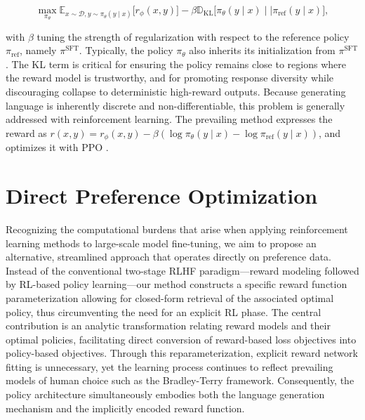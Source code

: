 \begin{equation}\label{eq:RL}
\max_{\pi_{\theta}}  \mathbb{E}_{x\sim \mathcal{D}, y\sim \pi_{\theta}(y \mid x)}\bigl[r_{\phi}(x, y)\bigr] - \beta\mathbb{D}_{\textrm{KL}}\bigl[\pi_{\theta}(y\mid x)\mid \mid \pi_\text{ref}(y\mid x)\bigr],
\end{equation}

with $\beta$ tuning the strength of regularization with respect to the reference policy $\pi_\text{ref}$, namely $\pi^\text{SFT}$. Typically, the policy $\pi_\theta$ also inherits its initialization from $\pi^\text{SFT}$. The KL term is critical for ensuring the policy remains close to regions where the reward model is trustworthy, and for promoting response diversity while discouraging collapse to deterministic high-reward outputs. Because generating language is inherently discrete and non-differentiable, this problem is generally addressed with reinforcement learning. The prevailing method \citep{ziegler2020finetuning, stiennon2022learning, bai2022training, ouyang2022training} expresses the reward as ${r(x, y) = r_{\phi}(x, y) -\beta (\log \pi_{\theta}(y\mid x) - \log \pi_\text{ref}(y\mid x))}$, and optimizes it with PPO \cite{schulman2017proximal}.

\section{Direct Preference Optimization}\label{sec:DPO}

Recognizing the computational burdens that arise when applying reinforcement learning methods to large-scale model fine-tuning, we aim to propose an alternative, streamlined approach that operates directly on preference data. Instead of the conventional two-stage RLHF paradigm—reward modeling followed by RL-based policy learning—our method constructs a specific reward function parameterization allowing for closed-form retrieval of the associated optimal policy, thus circumventing the need for an explicit RL phase. The central contribution is an analytic transformation relating reward models and their optimal policies, facilitating direct conversion of reward-based loss objectives into policy-based objectives. Through this reparameterization, explicit reward network fitting is unnecessary, yet the learning process continues to reflect prevailing models of human choice such as the Bradley-Terry framework. Consequently, the policy architecture simultaneously embodies both the language generation mechanism and the implicitly encoded reward function.

